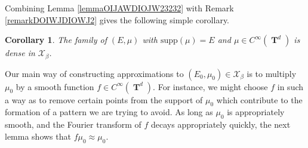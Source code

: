 \documentclass[12pt,reqno]{article}
\numberwithin{equation}{section}
\DeclareMathOperator{\TT}{\mathbf{T}}
\newtheorem{corollary}[theorem]{Corollary}
\numberwithin{theorem}{section}
\begin{document}
Combining Lemma \ref{lemmaOIJAWDIOJW23232} with Remark \ref{remarkDOIWJDIOWJ2} gives the following simple corollary.

\begin{corollary} \label{corollaryOIDJOWIJD2212}
    The family of $(E,\mu)$ with $\text{supp}(\mu) = E$ and $\mu \in C^\infty(\TT^d)$ is dense in $\mathcal{X}_\beta$.
\end{corollary}

Our main way of constructing approximations to $(E_0,\mu_0) \in \mathcal{X}_\beta$ is to multiply $\mu_0$ by a smooth function $f \in C^\infty(\TT^d)$. For instance, we might choose $f$ in such a way as to remove certain points from the support of $\mu_0$ which contribute to the formation of a pattern we are trying to avoid. As long as $\mu_0$ is appropriately smooth, and the Fourier transform of $f$ decays appropriately quickly, the next lemma shows that $f \mu_0 \approx \mu_0$.
\end{document}
